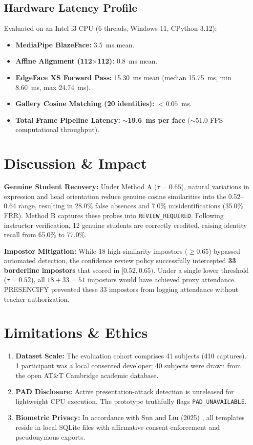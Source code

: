 \documentclass[conference]{IEEEtran}
\begin{document}
\subsection{Hardware Latency Profile}
Evaluated on an Intel i3 CPU (6 threads, Windows 11, CPython 3.12):
\begin{itemize}
    \item \textbf{MediaPipe BlazeFace:} 3.5~ms mean.
    \item \textbf{Affine Alignment (112$\times$112):} 0.8~ms mean.
    \item \textbf{EdgeFace XS Forward Pass:} 15.30~ms mean (median 15.75~ms, min 8.60~ms, max 24.74~ms).
    \item \textbf{Gallery Cosine Matching (20 identities):} $<0.05$~ms.
    \item \textbf{Total Frame Pipeline Latency:} \textbf{$\sim$19.6~ms per face} ($\sim$51.0 FPS computational throughput).
\end{itemize}

\section{Discussion \& Impact}
\textbf{Genuine Student Recovery:} Under Method A ($\tau = 0.65$), natural variations in expression and head orientation reduce genuine cosine similarities into the 0.52--0.64 range, resulting in 28.0\% false absences and 7.0\% misidentifications (35.0\% FRR). Method B captures these probes into \texttt{REVIEW\_REQUIRED}. Following instructor verification, 12 genuine students are correctly credited, raising identity recall from 65.0\% to 77.0\%.

\textbf{Impostor Mitigation:} While 18 high-similarity impostors ($\ge 0.65$) bypassed automated detection, the confidence review policy successfully intercepted \textbf{33 borderline impostors} that scored in $[0.52, 0.65)$. Under a single lower threshold ($\tau = 0.52$), all $18 + 33 = 51$ impostors would have achieved proxy attendance. PRESENCIFY prevented these 33 impostors from logging attendance without teacher authorization.

\section{Limitations \& Ethics}
\begin{enumerate}
    \item \textbf{Dataset Scale:} The evaluation cohort comprises 41 subjects (410 captures). 1 participant was a local consented developer; 40 subjects were drawn from the open AT\&T Cambridge academic database.
    \item \textbf{PAD Disclosure:} Active presentation-attack detection is unreleased for lightweight CPU execution. The prototype truthfully flags \texttt{PAD\_UNAVAILABLE}.
    \item \textbf{Biometric Privacy:} In accordance with Sun and Liu (2025) \cite{sun2025privacy}, all templates reside in local SQLite files with affirmative consent enforcement and pseudonymous exports.
\end{enumerate}
\end{document}
